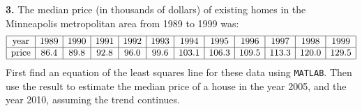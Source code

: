 \documentclass[11pt]{amsart}
\theoremstyle{definition}  %
\begin{document}
\noindent
{\bf 3.}  The median price (in thousands of dollars) of existing homes in the Minneapolis metropolitan area from 1989 to 1999 was:
$$ \begin{array}{|c|c|c|c|c|c|c|c|c|c|c|c|} 
\hline
\mathrm{year} & 1989 & 1990 & 1991 & 1992 & 1993 & 1994 &1995 & 1996 & 1997 &1998 & 1999  \\
\hline 
\mathrm{price} & 86.4 & 89.8 & 92.8 & 96.0 & 99.6 & 103.1 & 106.3 & 109.5 & 113.3 & 120.0 & 129.5 \\
\hline
\end{array} $$  
First find an equation of the least squares line for these data using {\tt MATLAB}. Then use the result to estimate the median price of a house in the year 2005, and 
the year 2010, assuming the trend continues. \\ 
\end{document}
